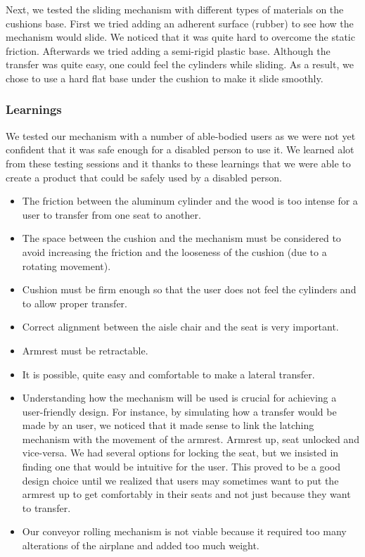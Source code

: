 Next, we tested the sliding mechanism with different types of materials on the cushions base. First we tried adding an adherent surface (rubber) to see how the mechanism would slide. We noticed that it was quite hard to overcome the static friction. Afterwards we tried adding a semi-rigid plastic base. Although the transfer was quite easy, one could feel the cylinders while sliding. As a result, we chose to use a hard flat base under the cushion to make it slide smoothly.   \\


\subsubsection{Learnings}

We tested our mechanism with a number of able-bodied users as we were not yet confident that it was safe enough for a disabled person to use it. We learned alot from these testing sessions and it thanks to these learnings that we were able to create a product that could be safely used by a disabled person.

\begin{itemize}
	\item The friction between the aluminum cylinder and the wood is too intense for a user to transfer from one seat to another.
	\item The space between the cushion and the mechanism must be considered to avoid increasing the friction and the looseness of the cushion (due to a rotating movement).
	\item Cushion must be firm enough so that the user does not feel the cylinders and to allow proper transfer.
	\item Correct alignment between the aisle chair and the seat is very important.
	\item Armrest must be retractable.
	\item It is possible, quite easy and comfortable to make a lateral transfer.
	\item Understanding how the mechanism will be used is crucial for achieving a user-friendly design. For instance, by simulating how a transfer would be made by an user, we noticed that it made sense to link the latching mechanism with the movement of the armrest. Armrest up, seat unlocked and vice-versa. We had several options for locking the seat, but we insisted in finding one that would be intuitive for the user. This proved to be a good design choice until we realized that users may sometimes want to put the armrest up  to get comfortably in their seats and not just because they want to transfer.
	\item Our conveyor rolling mechanism is not viable because it required too many alterations of the airplane and added too much weight.
\end{itemize}


